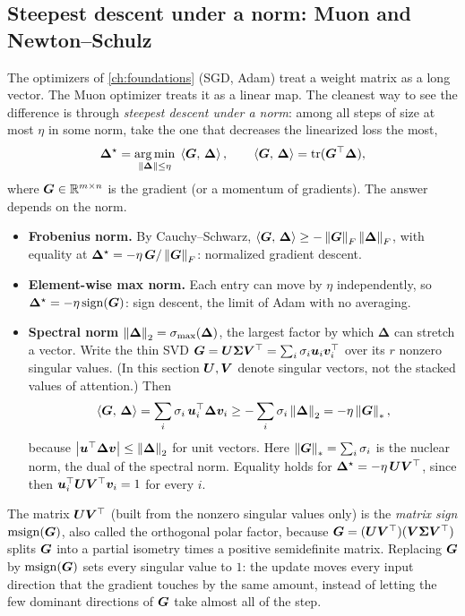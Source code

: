 \subsection{Steepest descent under a norm: Muon and Newton--Schulz}\label{sec:c11-muon}

The optimizers of \cref{ch:foundations} (SGD, Adam) treat a weight matrix as a long vector. The
Muon optimizer \citep{c01-jordan2024muon} treats it as a linear map. The cleanest way to see the
difference is through \emph{steepest descent under a norm}: among all steps of size at most
$\eta$ in some norm, take the one that decreases the linearized loss the most,
\begin{equation}
  \bm{\Delta}^\star = \operatorname*{arg\,min}_{\left\lVert \bm{\Delta}\right\rVert \le \eta}\; \left\langle \bm{G},\, \bm{\Delta}\right\rangle,
  \qquad \left\langle \bm{G},\, \bm{\Delta}\right\rangle = \operatorname{tr}(\bm{G}^{\top}\bm{\Delta}),
  \label{eq:c11-steepest}
\end{equation}
where $\bm{G} \in \mathbb{R}^{m\times n}$ is the gradient (or a momentum of gradients). The answer depends on
the norm.
\begin{itemize}
  \item \textbf{Frobenius norm.} By Cauchy--Schwarz, $\left\langle \bm{G},\, \bm{\Delta}\right\rangle \ge
  -\left\lVert \bm{G}\right\rVert_F\left\lVert \bm{\Delta}\right\rVert_F$, with equality at $\bm{\Delta}^\star = -\eta\,\bm{G}/\left\lVert \bm{G}\right\rVert_F$:
  normalized gradient descent.
  \item \textbf{Element-wise max norm.} Each entry can move by $\eta$ independently, so
  $\bm{\Delta}^\star = -\eta\operatorname{sign}(\bm{G})$: sign descent, the limit of Adam with no
  averaging.
  \item \textbf{Spectral norm} $\left\lVert \bm{\Delta}\right\rVert_2 = \sigma_{\max}(\bm{\Delta})$, the largest factor
  by which $\bm{\Delta}$ can stretch a vector. Write the thin SVD $\bm{G} = \bm{U}\bm{\Sigma}\bm{V}^{\top} =
  \sum_i\sigma_i\bm{u}_i\bm{v}_i^{\top}$ over its $r$ nonzero singular values. (In this section $\bm{U},\bm{V}$
  denote singular vectors, not the stacked values of attention.) Then
  \begin{equation}
    \left\langle \bm{G},\, \bm{\Delta}\right\rangle = \sum_i\sigma_i\,\bm{u}_i^{\top}\bm{\Delta}\bm{v}_i \ge -\sum_i\sigma_i\left\lVert \bm{\Delta}\right\rVert_2
    = -\eta\left\lVert \bm{G}\right\rVert_* ,
    \label{eq:c11-nuclear}
  \end{equation}
  because $\left\lvert \bm{u}^{\top}\bm{\Delta}\bm{v}\right\rvert \le \left\lVert \bm{\Delta}\right\rVert_2$ for unit vectors. Here
  $\left\lVert \bm{G}\right\rVert_* = \sum_i\sigma_i$ is the nuclear norm, the dual of the spectral norm. Equality holds
  for $\bm{\Delta}^\star = -\eta\,\bm{U}\bm{V}^{\top}$, since then $\bm{u}_i^{\top}\bm{U}\bm{V}^{\top}\bm{v}_i = 1$ for every $i$.
\end{itemize}
The matrix $\bm{U}\bm{V}^{\top}$ (built from the nonzero singular values only) is the \emph{matrix sign}
$\operatorname{msign}(\bm{G})$, also called the orthogonal polar factor, because
$\bm{G} = (\bm{U}\bm{V}^{\top})(\bm{V}\bm{\Sigma}\bm{V}^{\top})$ splits $\bm{G}$ into a partial isometry times a positive
semidefinite matrix. Replacing $\bm{G}$ by $\operatorname{msign}(\bm{G})$ sets every singular value to
$1$: the update moves every input direction that the gradient touches by the same amount,
instead of letting the few dominant directions of $\bm{G}$ take almost all of the step.


